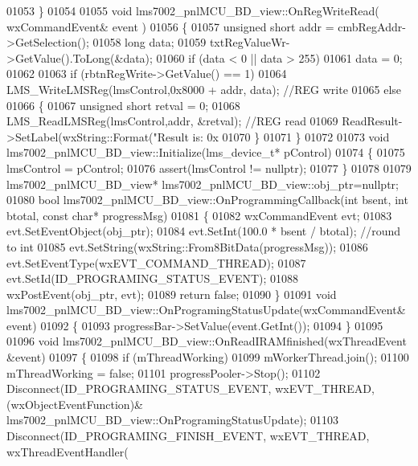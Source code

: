 \begin{DoxyCode}
{{{{{{{{{{{{{{{{{{01053 \}
01054 
01055 \textcolor{keywordtype}{void} lms7002_pnlMCU_BD_view::OnRegWriteRead( wxCommandEvent& event )
01056 \{
01057     \textcolor{keywordtype}{unsigned} \textcolor{keywordtype}{short} addr = cmbRegAddr->GetSelection();
01058     \textcolor{keywordtype}{long} data;
01059     txtRegValueWr->GetValue().ToLong(&data);
01060     \textcolor{keywordflow}{if} (data < 0 || data > 255)
01061         data = 0;
01062 
01063     \textcolor{keywordflow}{if} (rbtnRegWrite->GetValue() == 1)
01064         LMS_WriteLMSReg(lmsControl,0x8000 + addr, data); \textcolor{comment}{//REG write}
01065     \textcolor{keywordflow}{else}
01066     \{
01067         \textcolor{keywordtype}{unsigned} \textcolor{keywordtype}{short} retval = 0;
01068         LMS_ReadLMSReg(lmsControl,addr, &retval); \textcolor{comment}{//REG read}
01069         ReadResult->SetLabel(wxString::Format(\textcolor{stringliteral}{"Result is: 0x%
01070     \}
01071 \}
01072 
01073 \textcolor{keywordtype}{void} lms7002_pnlMCU_BD_view::Initialize(lms_device_t* pControl)
01074 \{
01075     lmsControl = pControl;
01076     assert(lmsControl != \textcolor{keyword}{nullptr});
01077 \}
01078 
01079 lms7002_pnlMCU_BD_view* lms7002_pnlMCU_BD_view::obj_ptr=\textcolor{keyword}{nullptr};
01080 \textcolor{keywordtype}{bool} lms7002_pnlMCU_BD_view::OnProgrammingCallback(\textcolor{keywordtype}{int} bsent, \textcolor{keywordtype}{int} btotal, \textcolor{keyword}{const} \textcolor{keywordtype}{char}* progressMsg)
01081 \{
01082     wxCommandEvent evt;
01083     evt.SetEventObject(obj_ptr);
01084     evt.SetInt(100.0 * bsent / btotal); \textcolor{comment}{//round to int}
01085     evt.SetString(wxString::From8BitData(progressMsg));
01086     evt.SetEventType(wxEVT\_COMMAND\_THREAD);
01087     evt.SetId(ID_PROGRAMING_STATUS_EVENT);
01088     wxPostEvent(obj_ptr, evt);
01089     \textcolor{keywordflow}{return} \textcolor{keyword}{false};
01090 \}
01091 \textcolor{keywordtype}{void} lms7002_pnlMCU_BD_view::OnProgramingStatusUpdate(wxCommandEvent& event)
01092 \{
01093     progressBar->SetValue(event.GetInt());
01094 \}
01095 
01096 \textcolor{keywordtype}{void} lms7002_pnlMCU_BD_view::OnReadIRAMfinished(wxThreadEvent &event)
01097 \{
01098     \textcolor{keywordflow}{if} (mThreadWorking)
01099         mWorkerThread.join();
01100     mThreadWorking = \textcolor{keyword}{false};
01101     progressPooler->Stop();
01102     Disconnect(ID_PROGRAMING_STATUS_EVENT, wxEVT\_THREAD, (wxObjectEventFunction)&
      lms7002_pnlMCU_BD_view::OnProgramingStatusUpdate);
01103     Disconnect(ID_PROGRAMING_FINISH_EVENT, wxEVT\_THREAD, wxThreadEventHandler(
}}}}}}}}}}}}}}}}}}}
\end{DoxyCode}
